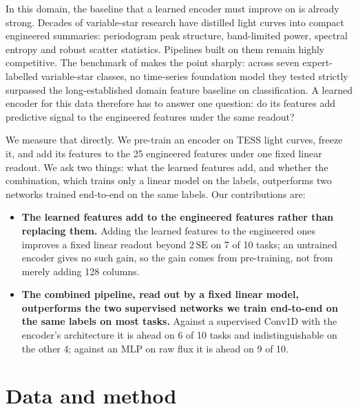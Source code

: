 \documentclass{article}
\begin{document}
In this domain, the baseline that a learned encoder must improve on is already strong. Decades of variable-star
research have distilled light curves into compact engineered summaries: periodogram peak structure,
band-limited power, spectral entropy and robust scatter statistics. Pipelines built on them remain
highly competitive. The benchmark of \citet{li2025staremb} makes the point
sharply: across seven expert-labelled variable-star classes, no time-series foundation model they
tested strictly surpassed the long-established domain feature baseline on classification. A learned
encoder for this data therefore has to answer one question: do its features add predictive signal to
the engineered features under the same readout?

We measure that directly. We pre-train an encoder on TESS light curves, freeze it, and add its
features to the 25 engineered features under one fixed linear readout. We ask two things: what the
learned features add, and whether the combination, which trains only a linear model on the labels,
outperforms two networks trained end-to-end on the same labels. Our contributions are:

\begin{itemize}
\item \textbf{The learned features add to the engineered features rather than replacing them.}
Adding the learned features to the engineered ones improves a fixed linear readout beyond
$2\,\mathrm{SE}$ on 7 of 10 tasks; an untrained encoder gives no such gain, so the gain comes from pre-training,
not from merely adding 128 columns.
\item \textbf{The combined pipeline, read out by a fixed linear model, outperforms the two
supervised networks we train end-to-end on the same labels on most tasks.} Against a supervised Conv1D with the
encoder's architecture it is ahead on 6
of 10 tasks and indistinguishable on the other 4; against an MLP on raw flux it is ahead on 9 of 10.
\end{itemize}

\section{Data and method}
\end{document}
